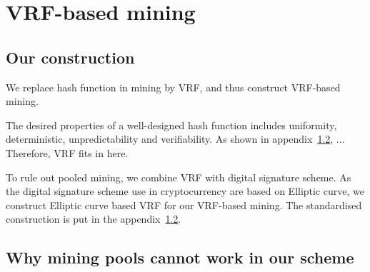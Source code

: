 \section{VRF-based mining}

\subsection{Our construction}

We replace hash function in mining by VRF, and thus construct VRF-based mining.

The desired properties of a well-designed hash function includes uniformity, deterministic, unpredictability and verifiability.
As shown in appendix~\ref{}, ...
Therefore, VRF fits in here.

To rule out pooled mining, we combine VRF with digital signature scheme.
As the digital signature scheme use in cryptocurrency are based on Elliptic curve, we construct Elliptic curve based VRF for our VRF-based mining.
The standardised construction is put in the appendix~\ref{}.

\subsection{Why mining pools cannot work in our scheme}



